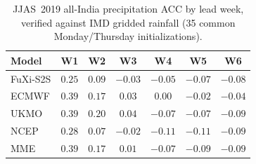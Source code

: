 \begin{table}[t]
  \centering
  \caption{JJAS~2019 all-India precipitation ACC by lead week, verified against IMD gridded rainfall (35 common Monday/Thursday initializations).}
  \label{tab:jjas_acc_tp}
  \small
  \begin{tabular}{lcccccc}
    \toprule
    Model & W1 & W2 & W3 & W4 & W5 & W6 \\
    \midrule
    FuXi-S2S       & $0.25$ & $0.09$ & $-0.03$ & $-0.05$ & $-0.07$ & $-0.08$ \\
ECMWF          & $\mathbf{0.39}$ & $0.17$ & $0.03$ & $\mathbf{0.00}$ & $\mathbf{-0.02}$ & $\mathbf{-0.04}$ \\
UKMO           & $0.39$ & $\mathbf{0.20}$ & $\mathbf{0.04}$ & $-0.07$ & $-0.07$ & $-0.09$ \\
NCEP           & $0.28$ & $0.07$ & $-0.02$ & $-0.11$ & $-0.11$ & $-0.09$ \\
MME            & $0.39$ & $0.17$ & $0.01$ & $-0.07$ & $-0.09$ & $-0.09$ \\
    \bottomrule
  \end{tabular}
\end{table}

